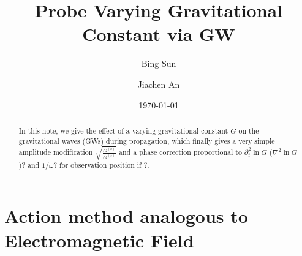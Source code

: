 \documentclass[
    jor,
    amsmath,amssymb,preprint,
    superscriptaddress,
]{revtex4-2}
\begin{document}

\title[Probe Varying Gravitational Constant via GW]{Probe Varying Gravitational Constant via GW}%

\author{Bing Sun}
\author{Jiachen An}

\date{\today}%

\begin{abstract}
In this note, we give the effect of a varying gravitational constant $G$ on the gravitational waves (GWs) during propagation, which finally gives a very simple amplitude modification $\sqrt{\frac{G^{(o)}}{G^{(s)}}}$ and a phase correction proportional to ${\partial_t^2}\ln G$ ($\nabla^2 \ln G$)? and $1/\omega$? for observation position if ?.
\end{abstract}


\maketitle

\section{Action method analogous to Electromagnetic Field}
\end{document}
